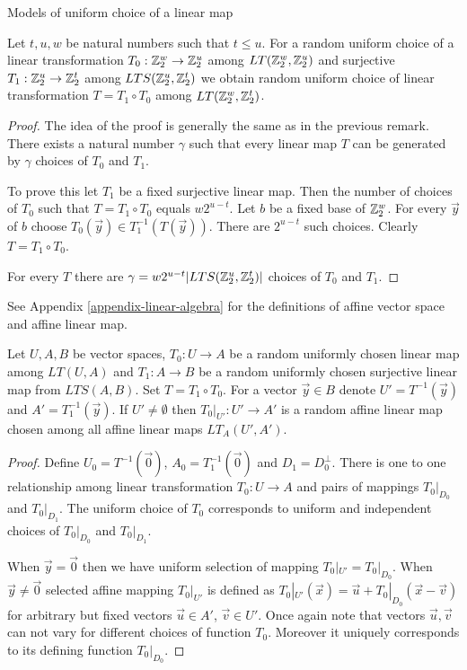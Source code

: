 \begin{section}{Models of uniform choice of a linear map}
\begin{remark}
\label{remark-model-uniform-linear-map-selection}
Let $t, u, w$ be natural numbers such that $t \leq u$. For a random uniform choice of a linear transformation $T_0: \mathbb{Z}_{2}^{w} \rightarrow \mathbb{Z}_{2}^{u}$ among $LT(\mathbb{Z}_{2}^{w}, \mathbb{Z}_{2}^{u})$ and surjective $T_1: \mathbb{Z}_{2}^{u} \rightarrow \mathbb{Z}_{2}^{t}$ among $LTS(\mathbb{Z}_{2}^{u}, \mathbb{Z}_{2}^{t})$ we obtain random uniform choice of linear transformation $T = T_1 \circ T_0$ among $LT(\mathbb{Z}_{2}^{w}, \mathbb{Z}_{2}^{t})$.
\end{remark}
\begin{proof}
The idea of the proof is generally the same as in the previous remark. There exists a natural number $\gamma$ such that every linear map $T$ can be generated by $\gamma$ choices of $T_0$ and $T_1$.

To prove this let $T_1$ be a fixed surjective linear map. Then the number of choices of $T_0$ such that $T = T_1 \circ T_0$ equals $w 2 ^ {u - t}$. Let $b$ be a fixed base of  $\mathbb{Z}_{2}^{w}$. For every $\vec{y}$ of $b$ choose $T_0(\vec{y}) \in T_1^{-1}(T(\vec{y}))$. There are $2^{u - t}$ such choices. Clearly $T = T_1 \circ T_0$.

For every $T$ there are $\gamma = w 2 ^ {u - t} |LTS(\mathbb{Z}_{2}^{u}, \mathbb{Z}_{2}^{t})|$ choices of $T_0$ and $T_1$.
\end{proof}

See Appendix \ref{appendix-linear-algebra} for the definitions of affine vector space and affine linear map.

\begin{remark}
\label{remark-model-uniform-linear-map-selection-affine}
Let $U, A, B$ be vector spaces, $T_0: U \rightarrow A$ be a random uniformly chosen linear map among $LT(U, A)$ and $T_1: A \rightarrow B$ be a random uniformly chosen surjective linear map from $LTS(A, B)$. Set $T = T_1 \circ T_0$. For a vector $\vec{y} \in B$ denote $U' = T^{-1}(\vec{y})$ and $A' = T_1^{-1}(\vec{y})$. If $U' \neq \emptyset$ then $T_0|_{U'}: U' \rightarrow A'$ is a random affine linear map chosen among all affine linear maps $LT_{A}(U', A')$.
\end{remark}
\begin{proof}
Define $U_0 = T^{-1}(\vec{0})$, $A_0 = T_1^{-1}(\vec{0})$ and $D_1 = D_0 ^ {\bot}$. There is one to one relationship among linear transformation $T_0: U \rightarrow A$ and pairs of mappings $T_0|_{D_0}$ and $T_0|_{D_1}$. The uniform choice of $T_0$ corresponds to uniform and independent choices of $T_0|_{D_0}$ and $T_0|_{D_1}$. 

When $\vec{y} = \vec{0}$ then we have uniform selection of mapping $T_0|_{U'} = T_0|_{D_0}$. When $\vec{y} \neq \vec{0}$ selected affine mapping $T_0|_{U'}$ is defined as $T_0|_{U'}(\vec{x}) = \vec{u} + T_0|_{D_0}(\vec{x} - \vec{v})$ for arbitrary but fixed vectors $\vec{u} \in A'$, $\vec{v} \in U'$. Once again note that vectors $\vec{u}, \vec{v}$ can not vary for different choices of function $T_0$. Moreover it uniquely corresponds to its defining function $T_0|_{D_0}$.
\end{proof}
\end{section}
